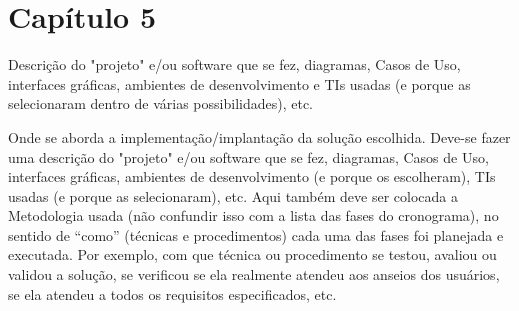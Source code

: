 \chapter{Capítulo 5}

Descrição  do  "projeto"  e/ou  software  que  se  fez,  diagramas, Casos  de  Uso,  interfaces gráficas, ambientes de desenvolvimento e TIs usadas (e porque as selecionaram dentro de várias possibilidades), etc.

Onde se aborda a implementação/implantação da solução escolhida. 
Deve-se fazer uma descrição do "projeto" e/ou software que se fez, diagramas, Casos de Uso, interfaces gráficas, ambientes de desenvolvimento (e porque os escolheram), TIs usadas (e porque as selecionaram), etc.
Aqui também deve ser colocada a Metodologia usada (não confundir isso com a lista das fases do cronograma), no sentido de “como” (técnicas e procedimentos) cada uma das fases foi planejada e executada. Por exemplo, com que técnica ou procedimento se testou, avaliou ou validou a solução, se verificou se ela realmente atendeu aos anseios dos usuários, se ela atendeu a todos os requisitos especificados, etc.